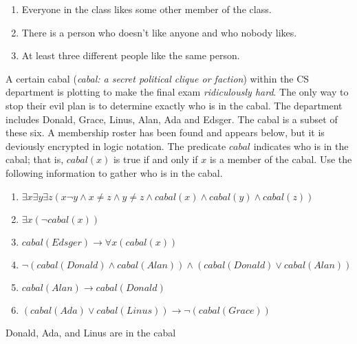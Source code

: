 \documentclass[]{exam}
\begin{document}
\begin{questions}
      \ifprintanswers\else
      \fi

      \begin{solution}
        \begin{enumerate}
          \item Everyone in the class likes some other member of the class.
          \item There is a person who doesn't like anyone and who nobody likes.
          \item At least three different people like the same person.
        \end{enumerate}
      \end{solution}

    \question A certain cabal (\emph{cabal: a secret political clique or
      faction}) within the CS department is plotting to make the final exam
      \emph{ridiculously hard}. The only way to stop their evil plan is to
      determine exactly who is in the cabal. The department includes Donald,
      Grace, Linus, Alan, Ada and Edsger. The cabal is a subset of these six. A
      membership roster has been found and appears below, but it is deviously
      encrypted in logic notation. The predicate $cabal$ indicates who is in the
      cabal; that is, $cabal(x)$ is true if and only if $x$ is a member of the
      cabal. Use the following information to gather who is in the cabal. 

      \begin{enumerate}
        \item $\exists x \exists y \exists z (x \lnot y \land x \neq z \land y
          \neq z \land cabal(x) \land cabal(y) \land cabal(z))$
        \item $\exists x (\lnot cabal(x))$
        \item $cabal(Edsger) \rightarrow \forall x (cabal(x))$
        \item $\lnot (cabal(Donald) \land cabal(Alan)) \land (cabal(Donald) \lor
          cabal(Alan))$
        \item $cabal(Alan) \rightarrow cabal(Donald)$
        \item $(cabal(Ada) \lor cabal(Linus)) \rightarrow \lnot(cabal(Grace))$
      \end{enumerate}

      \ifprintanswers\else
      \fi

      \begin{solution}
        Donald, Ada, and Linus are in the cabal
      \end{solution}
  \end{questions}
\end{document}
